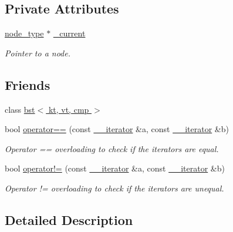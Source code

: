 \subsection*{Private Attributes}
\begin{DoxyCompactItemize}
\item 
\mbox{\label{classbst_1_1____iterator_a57365ae11a6b960739d460f6ab62674e}} 
\hyperlink{classbst_a062eb2a1ac54802dbc4f0f74ae2afd01}{node\+\_\+type} $\ast$ \hyperlink{classbst_1_1____iterator_a57365ae11a6b960739d460f6ab62674e}{\+\_\+current}
\begin{DoxyCompactList}\small\item\em Pointer to a node. \end{DoxyCompactList}\end{DoxyCompactItemize}
\subsection*{Friends}
\begin{DoxyCompactItemize}
\item 
class \hyperlink{classbst_1_1____iterator_a7aa3d08ff37cace553bd05620c22f924}{bst$<$ kt, vt, cmp $>$}
\item 
bool \hyperlink{classbst_1_1____iterator_a2e5014cb825532053115734598e16318}{operator==} (const \hyperlink{classbst_1_1____iterator}{\+\_\+\+\_\+iterator} \&a, const \hyperlink{classbst_1_1____iterator}{\+\_\+\+\_\+iterator} \&b)
\begin{DoxyCompactList}\small\item\em Operator == overloading to check if the iterators are equal. \end{DoxyCompactList}\item 
bool \hyperlink{classbst_1_1____iterator_add0144e7693bde5e4b509b5fd8dc5c96}{operator!=} (const \hyperlink{classbst_1_1____iterator}{\+\_\+\+\_\+iterator} \&a, const \hyperlink{classbst_1_1____iterator}{\+\_\+\+\_\+iterator} \&b)
\begin{DoxyCompactList}\small\item\em Operator != overloading to check if the iterators are unequal. \end{DoxyCompactList}\end{DoxyCompactItemize}


\subsection{Detailed Description}
